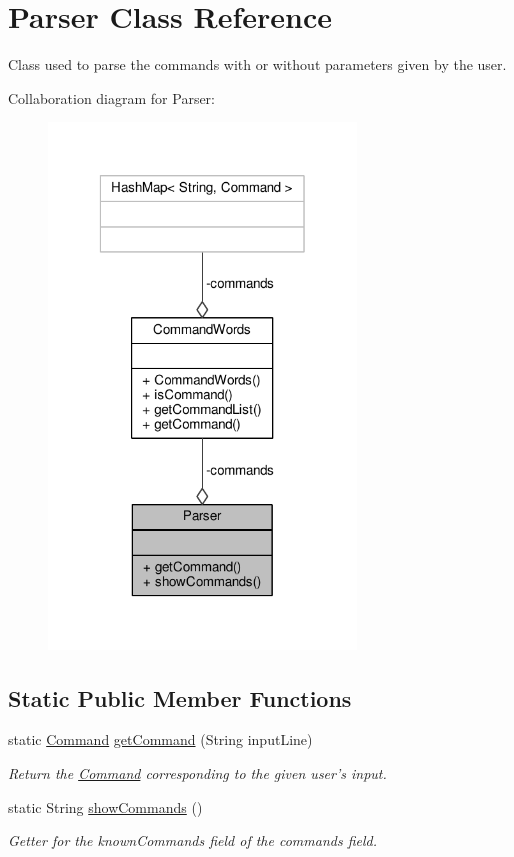 \hypertarget{classParser}{\section{Parser Class Reference}
\label{classParser}
}


Class used to parse the commands with or without parameters given by the user.  




Collaboration diagram for Parser\-:
\nopagebreak
\begin{figure}[H]
\begin{center}
\leavevmode
\includegraphics[width=232pt]{classParser__coll__graph}
\end{center}
\end{figure}
\subsection*{Static Public Member Functions}
\begin{DoxyCompactItemize}
\item 
static \hyperlink{classCommand}{Command} \hyperlink{classParser_a4b9b987a0c1b0f4f742020f1be21edfa}{get\-Command} (String input\-Line)
\begin{DoxyCompactList}\small\item\em Return the \hyperlink{classCommand}{Command} corresponding to the given user's input. \end{DoxyCompactList}\item 
static String \hyperlink{classParser_a2510fee1c8d7298e222edaf1f34660dc}{show\-Commands} ()
\begin{DoxyCompactList}\small\item\em Getter for the known\-Commands field of the commands field. \end{DoxyCompactList}\end{DoxyCompactItemize}
